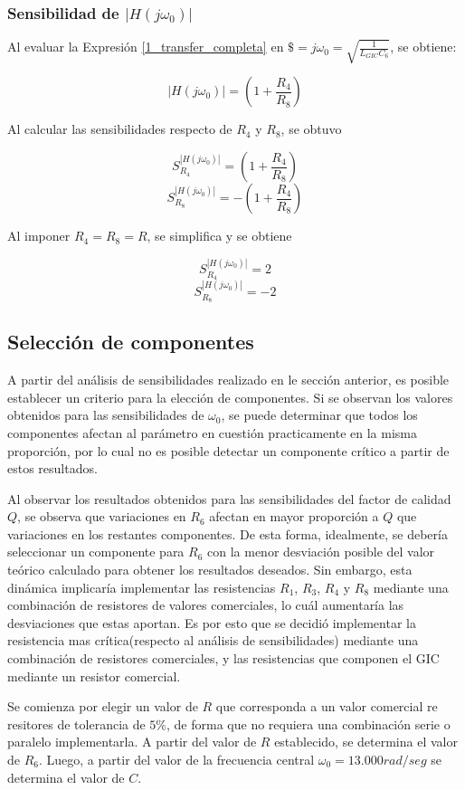 \subsubsection{Sensibilidad de $|H(j\omega_0)|$}
Al evaluar la Expresión \ref{1_transfer_completa} en $\$ = j\omega_0 = \sqrt{\frac{1}{L_{GIC}C_6}}$, se obtiene:

\[
|H(j\omega_0)| = \left(1 + \frac{R_4}{R_8}\right)
\]

Al calcular las sensibilidades respecto de $R_4$ y $R_8$, se obtuvo

\[
S_{R_4}^{|H(j\omega_0)|} = \left(1 + \frac{R_4}{R_8}\right)
\]
\[
S_{R_8}^{|H(j\omega_0)|} = -\left(1 + \frac{R_4}{R_8}\right)
\]

Al imponer $R_4 = R_8 = R$, se simplifica y se obtiene

\[
S_{R_4}^{|H(j\omega_0)|} = 2
\]
\[
S_{R_8}^{|H(j\omega_0)|} = -2
\]

\subsection{Selección de componentes}
A partir del análisis de sensibilidades realizado en le sección anterior, es posible establecer un criterio para la elección de componentes. Si se observan los valores obtenidos para las sensibilidades de $\omega_0$, se puede determinar que todos los componentes afectan al parámetro en cuestión practicamente en la misma proporción, por lo cual no es posible detectar un componente crítico a partir de estos resultados.

Al observar los resultados obtenidos para las sensibilidades del factor de calidad $Q$, se observa que variaciones en $R_6$ afectan en mayor proporción a $Q$ que variaciones en los restantes componentes. De esta forma, idealmente, se debería seleccionar un componente para $R_6$ con la menor desviación posible del valor teórico calculado para obtener los resultados deseados. Sin embargo, esta dinámica implicaría implementar las resistencias $R_1$, $R_3$, $R_4$ y $R_8$ mediante una combinación de resistores de valores comerciales,  lo cuál aumentaría las desviaciones que estas aportan. Es por esto que se decidió implementar la resistencia mas crítica(respecto al análisis de sensibilidades) mediante una combinación de resistores comerciales, y las resistencias que componen el GIC mediante un resistor comercial.

Se comienza por elegir un valor de $R$ que corresponda a un valor comercial re resitores de tolerancia de $5\%$, de forma que no requiera una combinación serie o paralelo implementarla. A partir del valor de $R$ establecido, se determina el valor de $R_6$. Luego, a partir del valor de la frecuencia central $\omega_0=13.000 rad/seg $ se determina el valor de $C$.

